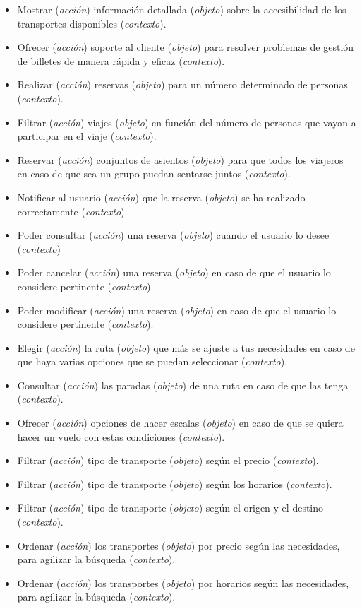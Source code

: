 \begin{itemize}
    \item Mostrar (\textit{acción}) información detallada (\textit{objeto}) sobre la accesibilidad de los transportes disponibles (\textit{contexto}).
    \item Ofrecer (\textit{acción}) soporte al cliente (\textit{objeto}) para resolver problemas de gestión de billetes de manera rápida y eficaz (\textit{contexto}).
    \item Realizar (\textit{acción}) reservas (\textit{objeto}) para un número determinado de personas (\textit{contexto}).
    \item Filtrar (\textit{acción}) viajes (\textit{objeto}) en función del número de personas que vayan a participar en el viaje (\textit{contexto}).
    \item Reservar (\textit{acción}) conjuntos de asientos (\textit{objeto}) para que todos los viajeros en caso de que sea un grupo puedan sentarse juntos (\textit{contexto}).
    \item Notificar al usuario (\textit{acción}) que la reserva (\textit{objeto}) se ha realizado correctamente (\textit{contexto}).
    \item Poder consultar (\textit{acción}) una reserva (\textit{objeto}) cuando el usuario lo desee (\textit{contexto})
    \item Poder cancelar (\textit{acción}) una reserva (\textit{objeto}) en caso de que el usuario lo considere pertinente (\textit{contexto}).
    \item Poder modificar (\textit{acción}) una reserva (\textit{objeto}) en caso de que el usuario lo considere pertinente (\textit{contexto}).
    \item Elegir (\textit{acción}) la ruta (\textit{objeto}) que más se ajuste a tus necesidades en caso de que haya varias opciones que se puedan seleccionar (\textit{contexto}).
    \item Consultar (\textit{acción}) las paradas (\textit{objeto}) de una ruta en caso de que las tenga (\textit{contexto}).
    \item Ofrecer (\textit{acción}) opciones de hacer escalas (\textit{objeto}) en caso de que se quiera hacer un vuelo con estas condiciones (\textit{contexto}).
    \item Filtrar (\textit{acción}) tipo de transporte (\textit{objeto}) según el precio (\textit{contexto}).
    \item Filtrar (\textit{acción}) tipo de transporte (\textit{objeto}) según los horarios (\textit{contexto}).
    \item Filtrar (\textit{acción}) tipo de transporte (\textit{objeto}) según el origen y el destino (\textit{contexto}).
    \item Ordenar (\textit{acción}) los transportes (\textit{objeto}) por precio según las necesidades, para agilizar la búsqueda (\textit{contexto}).
    \item Ordenar (\textit{acción}) los transportes (\textit{objeto}) por horarios según las necesidades, para agilizar la búsqueda (\textit{contexto}).
\end{itemize}

